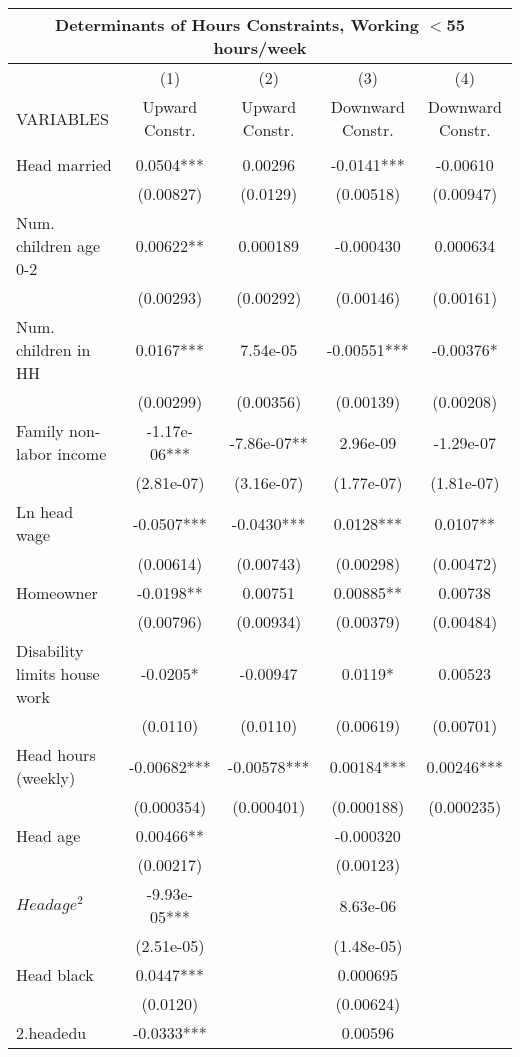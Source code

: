 \begin{tabular}{lcccc}
\multicolumn{5}{c}{Determinants of Hours Constraints, Working $<$55 hours/week} \\ \hline
 & (1) & (2) & (3) & (4) \\
VARIABLES & Upward Constr. & Upward Constr. & Downward Constr. & Downward Constr. \\ \hline
 &  &  &  &  \\
Head married & 0.0504*** & 0.00296 & -0.0141*** & -0.00610 \\
 & (0.00827) & (0.0129) & (0.00518) & (0.00947) \\
Num. children age 0-2 & 0.00622** & 0.000189 & -0.000430 & 0.000634 \\
 & (0.00293) & (0.00292) & (0.00146) & (0.00161) \\
Num. children in HH & 0.0167*** & 7.54e-05 & -0.00551*** & -0.00376* \\
 & (0.00299) & (0.00356) & (0.00139) & (0.00208) \\
Family non-labor income & -1.17e-06*** & -7.86e-07** & 2.96e-09 & -1.29e-07 \\
 & (2.81e-07) & (3.16e-07) & (1.77e-07) & (1.81e-07) \\
Ln head wage & -0.0507*** & -0.0430*** & 0.0128*** & 0.0107** \\
 & (0.00614) & (0.00743) & (0.00298) & (0.00472) \\
Homeowner & -0.0198** & 0.00751 & 0.00885** & 0.00738 \\
 & (0.00796) & (0.00934) & (0.00379) & (0.00484) \\
Disability limits house work & -0.0205* & -0.00947 & 0.0119* & 0.00523 \\
 & (0.0110) & (0.0110) & (0.00619) & (0.00701) \\
Head hours (weekly) & -0.00682*** & -0.00578*** & 0.00184*** & 0.00246*** \\
 & (0.000354) & (0.000401) & (0.000188) & (0.000235) \\
Head age & 0.00466** &  & -0.000320 &  \\
 & (0.00217) &  & (0.00123) &  \\
$ Head age^2$ & -9.93e-05*** &  & 8.63e-06 &  \\
 & (2.51e-05) &  & (1.48e-05) &  \\
Head black & 0.0447*** &  & 0.000695 &  \\
 & (0.0120) &  & (0.00624) &  \\
2.headedu & -0.0333*** &  & 0.00596 &  \\

\end{tabular}
